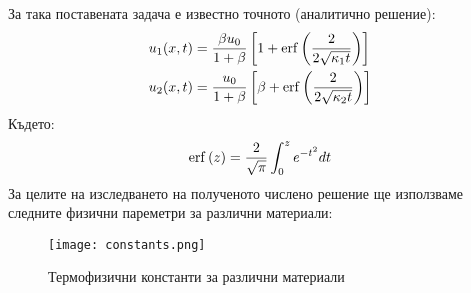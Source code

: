 За така поставената задача е известно точното (аналитично решение):
\begin{align}
	u_{1}(x, t) & = \frac{\beta u_0}{1+\beta} \left[1 + \operatorname{erf}{\left(\frac{2}{2\sqrt{\kappa_1 t}}\right)}\right] \\
	u_{2}(x, t) & = \frac{u_0}{1+\beta} \left[\beta + \operatorname{erf}{\left(\frac{2}{2\sqrt{\kappa_2 t}}\right)}\right]   
\end{align}
Където: 
\begin{equation*}
	\operatorname{erf}{(z)} = \frac{2}{\sqrt{\pi}} \displaystyle\int_{0}^{z} e ^{-t^2} dt
\end{equation*}
За целите на изследването на полученото числено решение ще използваме следните физични пареметри за различни материали:\\
\begin{figure}[h]
	\centering
	\texttt{[image: constants.png]}
	\caption{Термофизични константи за различни материали}
	\label{fig:constants}
\end{figure}
